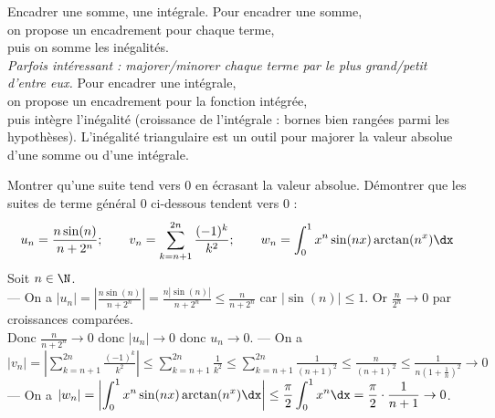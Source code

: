 \documentclass[11pt]{article}
\begin{document}
\begin{meth}{Encadrer une somme, une intégrale.}{}
    Pour encadrer une somme,\\
    \quad on propose un encadrement pour chaque terme,\\
    \quad puis on somme les inégalités.\\
    \emph{Parfois intéressant : majorer/minorer chaque terme par le plus grand/petit d'entre eux.}\n
    Pour encadrer une intégrale,\\
    \quad on propose un encadrement pour la fonction intégrée,\\
    \quad puis intègre l'inégalité (croissance de l'intégrale : bornes bien rangées parmi les hypothèses).\n
    L'inégalité triangulaire est un outil pour majorer la valeur absolue d'une somme ou d'une intégrale.
\end{meth}

\begin{ex}{Montrer qu'une suite tend vers 0 en écrasant la valeur absolue.}{}
    Démontrer que les suites de terme général 0 ci-dessous tendent vers 0 :
    \begin{equation*}
        u_n=\frac{n\sin(n)}{n+2^n}; \qquad v_n = \sum_{k=n+1}^{2n}\frac{(-1)^k}{k^2}; \qquad w_n=\int_0^1x^n\sin(nx)\arctan(n^x)\dx
    \end{equation*}
    \tcblower
    Soit $n\in\N$.\\
    --- On a $\displaystyle|u_n|=\left|\frac{n\sin(n)}{n+2^n}\right|=\frac{n|\sin(n)|}{n+2^n}\leq\frac{n}{n+2^n}$ car $|\sin(n)|\leq1$. Or $\displaystyle\frac{n}{2^n}\to0$ par croissances comparées.\\
    Donc $\displaystyle\frac{n}{n+2^n}\to0$ donc $|u_n|\to0$ donc $u_n\to0$.\n
    --- On a $\displaystyle|v_n|=\left|\sum_{k=n+1}^{2n}\frac{(-1)^k}{k^2}\right|\leq\sum_{k=n+1}^{2n}\frac{1}{k^2}\leq\sum_{k=n+1}^{2n}\frac{1}{(n+1)^2}\leq\frac{n}{(n+1)^2}\leq\frac{1}{n(1+\frac{1}{n})^2}\to0$\n
    --- On a $\displaystyle|w_n|=\left|\int_0^1x^n\sin(nx)\arctan(n^x)\dx\right|\leq\frac{\pi}{2}\int_0^1x^n\dx=\frac{\pi}{2}\cdot\frac{1}{n+1}\to0$.
\end{ex}
\end{document}
